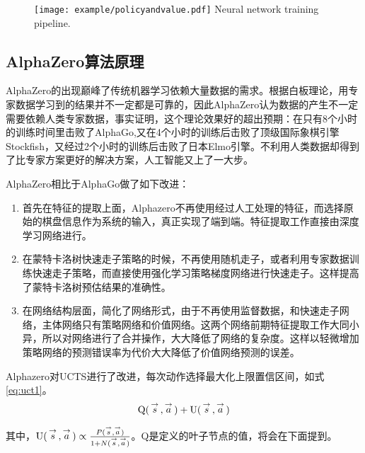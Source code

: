 \begin{figure}[htbp]
	\centering
	\texttt{[image: example/policyandvalue.pdf]}
	{Neural network training pipeline.}
	\label{fig:policyandvalue}
\end{figure}

\subsection{AlphaZero算法原理}

AlphaZero的出现巅峰了传统机器学习依赖大量数据的需求。根据白板理论，用专家数据学习到的结果并不一定都是可靠的，因此AlphaZero认为数据的产生不一定需要依赖人类专家数据，事实证明，这个理论效果好的超出预期：在只有8个小时的训练时间里击败了AlphaGo,又在4个小时的训练后击败了顶级国际象棋引擎Stockfish，又经过2个小时的训练后击败了日本Elmo引擎。不利用人类数据却得到了比专家方案更好的解决方案，人工智能又上了一大步。

AlphaZero相比于AlphaGo做了如下改进：
\begin{enumerate}
	\item 首先在特征的提取上面，Alphazero不再使用经过人工处理的特征，而选择原始的棋盘信息作为系统的输入，真正实现了端到端。特征提取工作直接由深度学习网络进行。
	\item 在蒙特卡洛树快速走子策略的时候，不再使用随机走子，或者利用专家数据训练快速走子策略，而直接使用强化学习策略梯度网络进行快速走子。这样提高了蒙特卡洛树预估结果的准确性。
	\item 在网络结构层面，简化了网络形式，由于不再使用监督数据，和快速走子网络，主体网络只有策略网络和价值网络。这两个网络前期特征提取工作大同小异，所以对网络进行了合并操作，大大降低了网络的复杂度。这样以轻微增加策略网络的预测错误率为代价大大降低了价值网络预测的误差。
\end{enumerate}

Alphazero对UCTS进行了改进，每次动作选择最大化上限置信区间，如式\ref{eq:uct1}。
\begin{equation}
\label{eq:uct1}
{\rm{Q(}}\mathop s\limits^ \to  {\rm{,}}\mathop a\limits^ \to  {\rm{) + U(}}\mathop s\limits^ \to  {\rm{,}}\mathop a\limits^ \to  {\rm{)}}
\end{equation}

其中，${\rm{U(}}\mathop s\limits^ \to  {\rm{,}}\mathop a\limits^ \to  {\rm{)}} \propto \frac{{P(\mathop s\limits^ \to  ,\mathop a\limits^ \to  )}}{{1 + N(\mathop s\limits^ \to  ,\mathop a\limits^ \to  )}}$。Q是定义的叶子节点的值，将会在下面提到。

